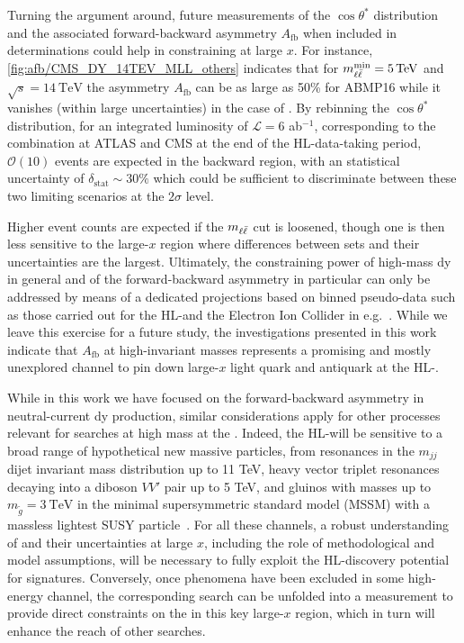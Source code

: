 Turning the argument around, future measurements of the $\cos\theta^*$
distribution and the associated forward-backward asymmetry 
$A_{\text{fb}}$ when included in \pdf determinations could help in
constraining \pdfs at large $x$.
%
For instance, \cref{fig:afb/CMS_DY_14TEV_MLL_others} indicates that for
$\mll^{\text{min}}=\SI{5}{\tera\electronvolt}$ and $\sqrt{s}=\SI{14}{\tera\electronvolt}$ the
asymmetry $A_{\text{fb}}$ can be as large as 50\% for ABMP16
while it vanishes (within large uncertainties) in the case of .
%
By rebinning the $\cos\theta^*$ distribution, for an integrated
luminosity of $\mathcal{L}=6$ ab$^{-1}$, corresponding to the
combination at ATLAS and CMS 
at the end of the HL-\lhc data-taking period, $\mathcal{O}(10)$ events are expected in the backward region,
with an statistical uncertainty of $\delta_{\text{stat}}\sim 30\%$ which could be sufficient to
discriminate between these two limiting scenarios at the $2\sigma$ level.

Higher event counts are expected if the $m_{\ell\bar{\ell}}$ cut is loosened, though one is
then less sensitive to the large-$x$ region where differences between \pdf sets and their
uncertainties are the largest.
%
Ultimately, the constraining power of high-mass \acrlong{dy} in general and of the forward-backward
asymmetry in particular can only be addressed by means of a dedicated projections
based on binned pseudo-data such as those carried
out for the HL-\lhc and the Electron Ion Collider in e.g.~\cite{AbdulKhalek:2018rok,Khalek:2021ulf}.
%
While we leave this exercise for a future study, the investigations
presented in this work indicate that $A_{\text{fb}}$
at high-invariant masses represents a promising and mostly
unexplored channel to pin down large-$x$ light
quark and antiquark \pdfs at the HL-\lhc.

While in this work
we have focused on the forward-backward asymmetry in neutral-current \acrlong{dy} production,
similar considerations apply for other processes relevant
for \bsm searches at high mass at the \lhc.
%
Indeed, the HL-\lhc will be sensitive to a broad range of hypothetical
new massive particles, from resonances in the $m_{jj}$ dijet invariant mass distribution up to 11 TeV,
heavy vector triplet resonances decaying into a diboson $VV'$ pair up to 5 TeV,
and gluinos with masses up to $m_{\tilde{g}}=\SI{3}{\tera\electronvolt}$ in the minimal
supersymmetric standard model (MSSM) with a massless lightest SUSY
particle~\cite{CidVidal:2018eel}.
%
For all these channels, a robust understanding of \pdfs
and their uncertainties at large $x$, including the role of
methodological and model assumptions, will be necessary to fully exploit
the HL-\lhc discovery potential for \bsm signatures.
%
%
Conversely, once \bsm phenomena have been excluded in some high-energy channel,
the corresponding search can be unfolded into a measurement to provide direct
constraints on the \pdfs in this key large-$x$ region, which in turn will
enhance the reach of other searches.

